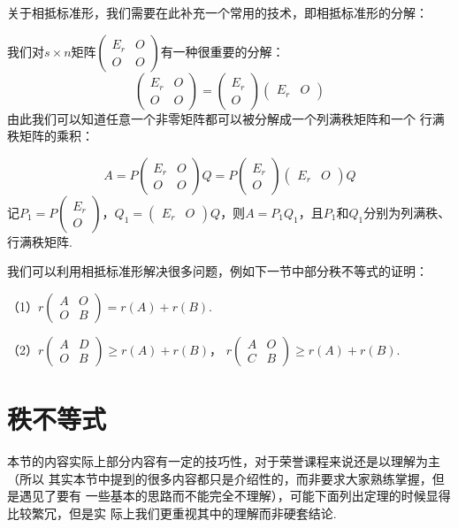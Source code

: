 关于相抵标准形，我们需要在此补充一个常用的技术，即相抵标准形的分解：

我们对$s \times n$矩阵$\begin{pmatrix}
	E_r & O \\ O & O
\end{pmatrix}$有一种很重要的分解：
$$\begin{pmatrix}
	E_r & O \\ O & O
\end{pmatrix}=\begin{pmatrix}
	E_r \\ O
\end{pmatrix}\begin{pmatrix}
	E_r & O
\end{pmatrix}$$ 由此我们可以知道任意一个非零矩阵都可以被分解成一个列满秩矩阵和一个
行满秩矩阵的乘积：

$$A=P\begin{pmatrix}
	E_r & O \\ O & O
\end{pmatrix}Q=P\begin{pmatrix}
	E_r \\ O
\end{pmatrix}\begin{pmatrix}
	E_r & O
\end{pmatrix}Q$$
记$P_1=P\begin{pmatrix}
	E_r \\ O
\end{pmatrix}$，$Q_1=\begin{pmatrix}
	E_r & O
\end{pmatrix}Q$，则$A=P_1Q_1$，且$P_1$和$Q_1$分别为列满秩、行满秩矩阵.

我们可以利用相抵标准形解决很多问题，例如下一节中部分秩不等式的证明：
\begin{example}
	\textup{（1）}$r\begin{pmatrix}
		A & O \\ O & B
	\end{pmatrix}=r(A)+r(B)$.

	\textup{（2）}$r\begin{pmatrix}
		A & D \\ O & B
	\end{pmatrix}\ge r(A)+r(B)$，
	$r\begin{pmatrix}
		A & O \\ C & B
	\end{pmatrix}\ge r(A)+r(B)$.
\end{example}

\section{秩不等式}
本节的内容实际上部分内容有一定的技巧性，对于荣誉课程来说还是以理解为主（所以
其实本节中提到的很多内容都只是介绍性的，而非要求大家熟练掌握，但是遇见了要有
一些基本的思路而不能完全不理解），可能下面列出定理的时候显得比较繁冗，但是实
际上我们更重视其中的理解而非硬套结论.

